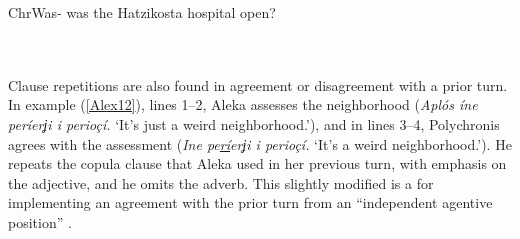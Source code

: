 \documentclass[output=paper]{LSP/langsci}
\begin{document}
\begin{Transcript}[FS {>}{>\hspace{0.1in}}]{Chr}{Was- was the Hatzikosta hospital open?}%
\label{Alex11}%
\\
      \\  
\\ 
\end{Transcript}

Clause repetitions are also found in agreement or disagreement with a prior turn. In example (\ref{Alex12}), lines 1--2, Aleka assesses the neighborhood (\textit{Αplós íne períerʝi i perioçí.} `It’s just a weird neighborhood.'), and in lines 3--4, Polychronis agrees with the assessment (\textit{Ine pe\underline{rí}erʝi i perioçí.} `It’s a weird neighborhood.'). He repeats the copula clause that Aleka used in her previous turn, with emphasis on the adjective, and he omits the adverb. This slightly modified  is a  for implementing an agreement with the prior turn from an ``independent agentive position'' \citep[][285]{Thompson15}.  
\end{document}

